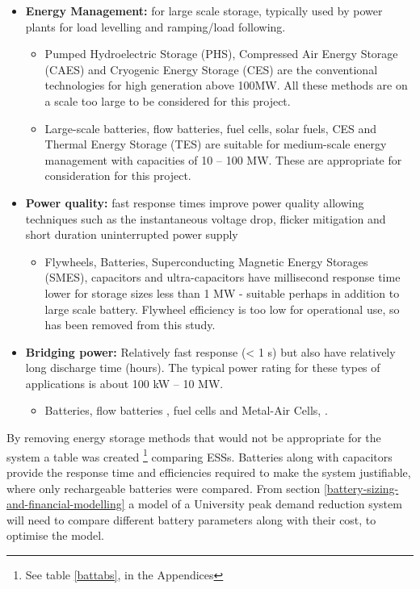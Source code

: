 \begin{itemize}
\tightlist
\item
  \textbf{Energy Management:} for large scale storage, typically used by
  power plants for load levelling and ramping/load following.

  \begin{itemize}
  \tightlist
  \item
    Pumped Hydroelectric Storage (PHS), Compressed Air Energy Storage
    (CAES) and Cryogenic Energy Storage (CES) are the conventional
    technologies for high generation above 100MW. All these methods are
    on a scale too large to be considered for this project.
  \item
    Large-scale batteries, flow batteries, fuel cells, solar fuels, CES
    and Thermal Energy Storage (TES) are suitable for medium-scale
    energy management with capacities of 10 -- 100 MW. These are
    appropriate for consideration for this project.
  \end{itemize}
\item
  \textbf{Power quality:} fast response times improve power quality
  allowing techniques such as the instantaneous voltage drop, flicker
  mitigation and short duration uninterrupted power supply

  \begin{itemize}
  \tightlist
  \item
    Flywheels, Batteries, Superconducting Magnetic Energy Storages
    (SMES), capacitors and ultra-capacitors have millisecond response
    time lower for storage sizes less than 1 MW - suitable perhaps in
    addition to large scale battery. Flywheel efficiency is too low for
    operational use, so has been removed from this study.
  \end{itemize}
\item
  \textbf{Bridging power:} Relatively fast response (\textless{} 1 s)
  but also have relatively long discharge time (hours). The typical
  power rating for these types of applications is about 100 kW -- 10 MW.

  \begin{itemize}
  \tightlist
  \item
    Batteries, flow batteries \cite{flowbatstan}, fuel cells and
    Metal-Air Cells\cite{Chen2009291}, \cite{batuni}.
  \end{itemize}
\end{itemize}

By removing energy storage methods that would not be appropriate for the
system a table was created
\footnote{See table \ref{battabs}, in the Appendices} comparing ESSs.
Batteries along with capacitors provide the response time
\cite{Choudar201521} and efficiencies required to make the system
justifiable, where only rechargeable batteries were compared. From
section \ref{battery-sizing-and-financial-modelling} a model of a
University peak demand reduction system will need to compare different
battery parameters along with their cost, to optimise the model.

\newpage
